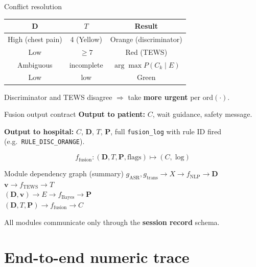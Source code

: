 \documentclass[aspectratio=169,11pt]{beamer}
\begin{document}
\begin{frame}{Conflict resolution}
	\small
	\begin{center}
		\begin{tabular}{@{}ccc@{}}
			\toprule
			$\mathbf{D}$ & $T$ & \textbf{Result} \\
			\midrule
			High (chest pain) & 4 (Yellow) & Orange (discriminator) \\
			Low & $\geq 7$ & Red (TEWS) \\
			Ambiguous & incomplete & $\arg\max P(C_k\mid E)$ \\
			Low & low & Green \\
			\bottomrule
		\end{tabular}
	\end{center}

	Discriminator and TEWS disagree $\Rightarrow$ take \textbf{more urgent} per $\mathrm{ord}(\cdot)$.
\end{frame}

\begin{frame}{Fusion output contract}
	\textbf{Output to patient:} $C$, wait guidance, safety message.

	\textbf{Output to hospital:} $C$, $\mathbf{D}$, $T$, $\mathbf{P}$, full \texttt{fusion\_log} with rule ID fired (e.g.\ \texttt{RULE\_DISC\_ORANGE}).

	\[
	f_{\text{fusion}}: (\mathbf{D}, T, \mathbf{P}, \text{flags}) \mapsto (C,\; \text{log})
	\]
\end{frame}

\begin{frame}{Module dependency graph (summary)}
	\footnotesize
	$g_{\text{ASR}}, g_{\text{trans}} \to X \to f_{\text{NLP}} \to \mathbf{D}$\\
	$\mathbf{v} \to f_{\text{TEWS}} \to T$\\
	$(\mathbf{D}, \mathbf{v}) \to E \to f_{\text{Bayes}} \to \mathbf{P}$\\
	$(\mathbf{D}, T, \mathbf{P}) \to f_{\text{fusion}} \to C$

	All modules communicate only through the \textbf{session record} schema.
\end{frame}

\section{End-to-end numeric trace}
\end{document}
